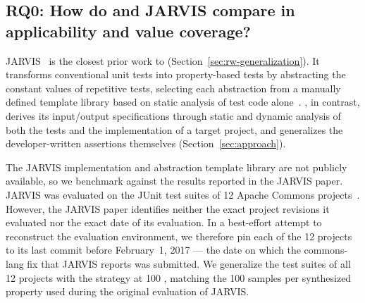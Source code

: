 \subsection{RQ0: How do \ToolTeralizer{} and JARVIS compare in applicability and value coverage?}
\label{sec:jarvis-comparison}

JARVIS~\cite{peleg_2018_jarvis} is the closest prior work to \ToolTeralizer{} (Section~\ref{sec:rw-generalization}).
It transforms conventional unit tests into property-based tests
by abstracting the constant values of repetitive tests,
selecting each abstraction from a manually defined template library
based on static analysis of test code alone~\cite{peleg_2018_jarvis}.
\ToolTeralizer{}, in contrast,
derives its input/output specifications
through static and dynamic analysis
of both the tests and the implementation of a target project,
and generalizes the developer-written assertions themselves (Section~\ref{sec:approach}).

The JARVIS implementation and abstraction template library are not publicly available,
so we benchmark \ToolTeralizer{} against the results reported in the JARVIS paper.
JARVIS was evaluated on the JUnit test suites
of 12 Apache Commons projects~\cite{peleg_2018_jarvis}.
However, the JARVIS paper identifies neither the exact project revisions it evaluated
nor the exact date of its evaluation.
In a best-effort attempt to reconstruct the evaluation environment,
we therefore pin each of the 12 projects
to its last commit before February~1, 2017 ---
the date on which the commons-lang fix that JARVIS reports was submitted.
We generalize the test suites of all 12 projects
with the \VariantImproved{} strategy at 100 \tries{},
matching the 100 samples per synthesized property used during the original evaluation of JARVIS.


